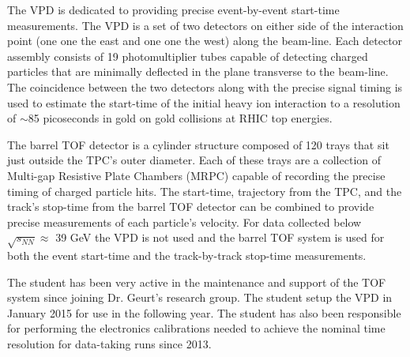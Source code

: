 The VPD is dedicated to providing precise event-by-event start-time measurements. The VPD is a set of two detectors on either side of the interaction point (one one the east and one one the west) along the beam-line. Each detector assembly consists of 19 photomultiplier tubes capable of detecting charged particles that are minimally deflected in the plane transverse to the beam-line. The coincidence between the two detectors along with the precise signal timing is used to estimate the start-time of the initial heavy ion interaction to a resolution of $\sim$85 picoseconds in gold on gold collisions at RHIC top energies\cite{llope_star_2014}.

The barrel TOF detector is a cylinder structure composed of 120 trays that sit just outside the TPC's outer diameter. Each of these trays are a collection of Multi-gap Resistive Plate Chambers (MRPC) capable of recording the precise timing of charged particle hits. The start-time, trajectory from the TPC, and the track's stop-time from the barrel TOF detector can be combined to provide precise measurements of each particle's velocity. For data collected below $\sqrt{s_{NN}} \approx $ 39 GeV the VPD is not used and the barrel TOF system is used for both the event start-time and the track-by-track stop-time measurements.

The student has been very active in the maintenance and support of the TOF system since joining Dr. Geurt's research group. The student setup the VPD in January 2015 for use in the following year. The student has also been responsible for performing the electronics calibrations needed to achieve the nominal time resolution for data-taking runs since 2013.